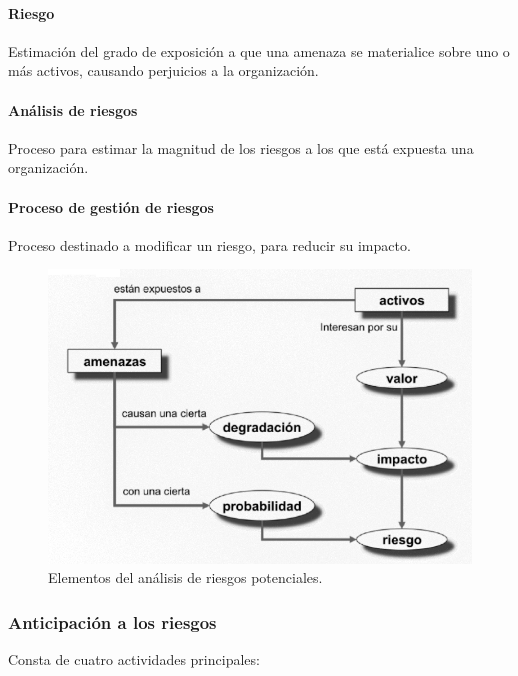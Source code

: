 \paragraph{Riesgo} Estimación del grado de exposición a que una amenaza se materialice sobre uno o más activos, causando perjuicios a la organización.

\paragraph{Análisis de riesgos} Proceso para estimar la magnitud de los riesgos a los que está expuesta una organización.

\paragraph{Proceso de gestión de riesgos} Proceso destinado a modificar un riesgo, para reducir su impacto.

\begin{figure}[H]
   \centering
   \includegraphics[width=0.6\linewidth]{Resources/Tema3/relacionesDefinicionesRiesgos.png}
   \caption{Elementos del análisis de riesgos potenciales.}
   \label{fig:relacionesDefinicionesRiesgos}
\end{figure}

\subsubsection{Anticipación a los riesgos}

Consta de cuatro actividades principales:

